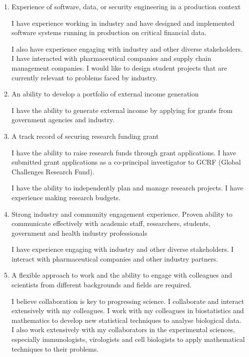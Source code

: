 \documentclass[10pt]{article}
\begin{document}
\begin{enumerate}
\item Experience of software, data, or security engineering in a production context

I have experience working in industry and have designed and implemented software systems running in production on critical financial data.

I also have experience engaging with industry and other diverse stakeholders. I have interacted with pharmaceutical companies and supply chain management companies. I would like to design student projects that are currently relevant to problems faced by industry. 







\item An ability to develop a portfolio of external income generation

I have the ability to generate external income by applying for grants from government agencies and industry.

\item A track record of securing research funding grant

I have the ability to raise research funds through grant applications. I have submitted grant applications as a co-principal investigator to GCRF (Global Challenges Research Fund).

I have the ability to independently plan and manage research projects. I have experience making research budgets.



\item Strong industry and community engagement experience. Proven ability to communicate effectively with academic staff, researchers, students, government and health industry professionals

I have experience engaging with industry and other diverse stakeholders. I interact with pharmaceutical companies and other industry partners.


\item A flexible approach to work and the ability to engage with colleagues and scientists from different backgrounds and fields are required.

I believe collaboration is key to progressing science. I collaborate and interact extensively with my colleagues. I work with my colleagues in biostatistics and mathematics to develop new statistical techniques to analyse biological data. I also work extensively with my collaborators in the experimental sciences, especially immunologists, virologists and cell biologists to apply mathematical techniques to their problems.



\end{enumerate}
\end{document}

